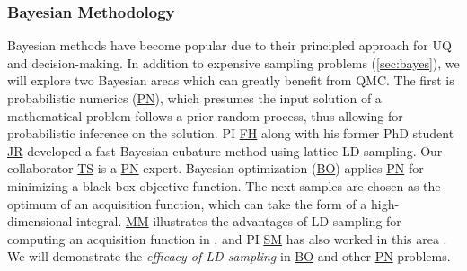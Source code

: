 \documentclass[11pt]{NSFamsart}
\newcommand{\FH}{\hyperlink{FHlink}{FH}\xspace}
\newcommand{\SM}{\hyperlink{SMlink}{SM}\xspace}
\newcommand{\MM}{\hyperlink{MMlink}{MM}\xspace}
\newcommand{\TS}{\hyperlink{TSlink}{TS}\xspace}
\newcommand{\JR}{\hyperlink{JRlink}{JR}\xspace}
\newcommand{\PN}{\hyperlink{PNlink}{PN}\xspace}
\newcommand{\BO}{\hyperlink{BOlink}{BO}\xspace}
\newcommand{\AGSNote}[1]{{\color{cyan}Aleksei: #1}}
\newcommand{\SMNote}[1]{{\color{blue}Simon: #1}}
\begin{document}
\subsubsection{Bayesian Methodology} Bayesian methods have become popular due to their principled approach for UQ and decision-making. In addition to expensive sampling problems (\cref{sec:bayes}), we will explore two Bayesian areas which can greatly benefit from QMC. The first is \hypertarget{PNlink}{probabilistic numerics} (\PN), which presumes the input solution of a mathematical problem follows a prior random process, thus allowing for probabilistic inference on the solution. PI \FH along with his former PhD student \JR developed a fast Bayesian cubature method \cite{RatHic19a} using lattice LD sampling.  Our collaborator \TS is a \PN expert. \hypertarget{BOlink}{Bayesian optimization} (\BO) applies \PN for minimizing a black-box objective function.  The next samples are chosen as the optimum of an acquisition function, which can take the form of a high-dimensional integral.  \MM illustrates the advantages of LD sampling for computing an acquisition function in \cite[qEI with QMCPy]{QMCBlog}, and PI \SM has also worked in this area \cite{mak2019analysis,chen2019hierarchical}. We will demonstrate the \emph{efficacy of LD sampling} in \BO and other \PN problems.

\end{document}
